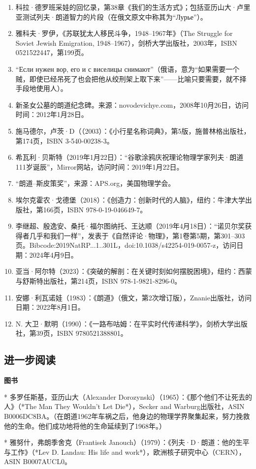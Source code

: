 \begin{enumerate}
\item 科拉·德罗班采娃的回忆录，第38章《我们的生活方式》；包括亚历山大·卢里亚测试列夫·朗道智力的片段（在俄文原文中称其为“Лурье”）。
\item 雅科夫·罗伊，《苏联犹太人移民斗争，1948–1967年》（The Struggle for Soviet Jewish Emigration, 1948–1967），剑桥大学出版社，2003年，ISBN 0521522447，第199页。
\item “Если нужен вор, его и с виселицы снимают”（俄语，意为“如果需要一个贼，即使已经吊死了也会把他从绞刑架上取下来”——比喻只要需要，就不择手段地使用人）。
\item 新圣女公墓的朗道纪念碑。来源：novodevichye.com，2008年10月26日，访问时间：2012年1月28日。
\item 施马德尔，卢茨·D（（2003）：《小行星名称词典》，第5版，施普林格出版社，第174页，ISBN 3-540-00238-3。
\item 希瓦利·贝斯特（2019年1月22日）：“谷歌涂鸦庆祝理论物理学家列夫·朗道111岁诞辰”，Mirror网站，访问时间：2019年1月22日。
\item “朗道–斯皮策奖”，来源：APS.org，美国物理学会。
\item 埃尔克霍农·戈德堡（2018）：《创造力：创新时代的人脑》，纽约：牛津大学出版社，第166页，ISBN 978-0-19-046649-7。
\item 李继超、殷逸安、桑托·福尔图纳托、王达顺（2019年4月18日）：“诺贝尔奖获得者几乎和我们一样”，发表于《自然评论·物理》，第1卷第5期，第301–303页。Bibcode:2019NatRP...1..301L，doi:10.1038/s42254-019-0057-z，访问日期：2024年4月9日。
\item 亚当·阿尔特（2023）：《突破的解剖：在关键时刻如何摆脱困境》，纽约：西蒙与舒斯特出版社，第214页，ISBN 978-1-9821-8296-0。
\item 安娜·利瓦诺娃（1983）：《朗道》（俄文，第2次增订版），Znanie出版社，访问日期：2022年8月1日。
\item N. 大卫·默明（1990）：《一路布咕姆：在平实时代传递科学》，剑桥大学出版社，第39页，ISBN 9780521388801。
\end{enumerate}
\subsection{进一步阅读}
\textbf{图书}

* 多罗任斯基，亚历山大（Alexander Dorozynski）（1965）：《那个他们不让死去的人》（*The Man They Wouldn't Let Die*），Secker and Warburg出版社，ASIN B0006DC8BA。（在朗道1962年车祸之后，他身边的物理学界聚集起来，努力挽救他的生命。他们成功地将他的生命延续到了1968年。）

* 雅努什，弗朗季舍克（Frantisek Janouch）（1979）：《列夫·D·朗道：他的生平与工作》（*Lev D. Landau: His life and work*），欧洲核子研究中心（CERN），ASIN B0007AUCL0。

